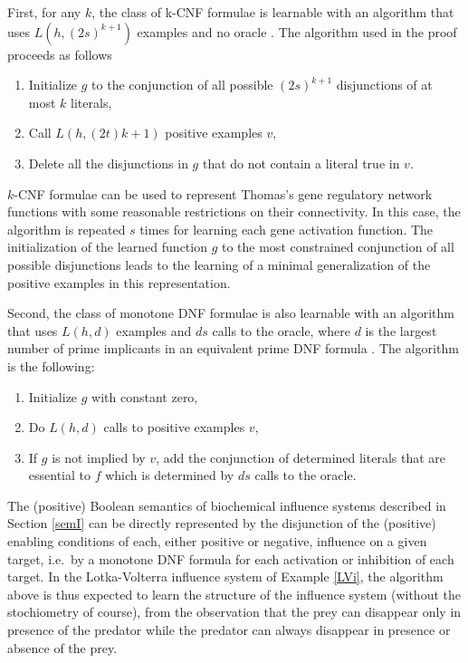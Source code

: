 \documentclass[graybox]{svmult}
\begin{document}
First, for any $k$, the class of k-CNF formulae is learnable with an
algorithm that uses $L(h,(2s)^{k+1})$ examples and no oracle \cite{Valiant84cacm}.
The algorithm used in the proof proceeds as follows
\begin{enumerate}
  \item Initialize $g$ to the conjunction of all possible $(2s)^{k+1}$ disjunctions of at most $k$ literals,
\item Call $L(h,(2t)k+1)$ positive examples $v$,
\item Delete all the disjunctions in $g$ that do not contain a literal true in $v$.
\end{enumerate}

\begin{example}
$k$-CNF formulae can be used to represent Thomas's gene regulatory network functions with some reasonable restrictions on their connectivity.
In this case, the algorithm is repeated $s$ times for learning each gene activation function.
The initialization of the learned function $g$ to the most constrained conjunction of all possible disjunctions
leads to the learning of a minimal generalization of the positive examples in this representation.
\end{example}

    Second, the class of monotone DNF formulae is also learnable with an algorithm that uses $L(h,d)$ examples and $ds$ calls to the oracle,
    where $d$ is the largest number of prime implicants in an equivalent prime DNF formula \cite{Valiant84cacm}.
The algorithm is the following:
\begin{enumerate}
\item Initialize $g$ with constant zero,
\item
Do $L(h,d)$ calls to positive examples $v$,
\item
If $g$ is not implied by $v$, add the conjunction of determined literals that are essential to $f$ which is determined by $ds$ calls to the oracle.
\end{enumerate}

\begin{example}
The (positive) Boolean semantics of biochemical influence systems described in Section \ref{semI}
can be directly represented by the disjunction of the (positive) enabling conditions of each, either positive or negative, influence on a given target,
i.e.~by a monotone DNF formula for each activation or inhibition of each target.
In the Lotka-Volterra influence system of Example \ref{LVi}, the algorithm above is thus expected to learn the structure of the influence system
(without the stochiometry of course),
from the observation that the prey can disappear only in presence of the predator
while the predator can always disappear in presence or absence of the prey.
\end{example}
\end{document}
